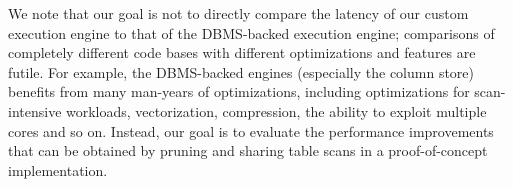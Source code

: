 We note that our goal is not to directly compare the latency of our custom
execution engine to that of the DBMS-backed execution
engine; comparisons of completely different code bases with different
optimizations and features are futile.  
For example, the DBMS-backed engines (especially the column store) benefits from 
many man-years of optimizations, including optimizations for scan-intensive workloads, 
vectorization, compression, the ability to exploit multiple cores and so on.  
Instead, our goal is to evaluate the performance improvements that can be
obtained by pruning and sharing table scans in a proof-of-concept implementation.


